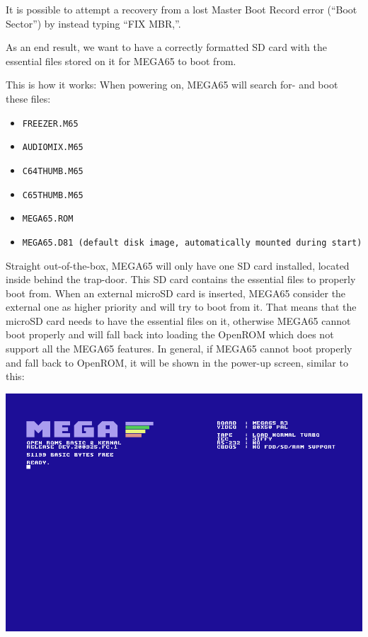 It is possible to attempt a recovery from a lost Master Boot Record error (``Boot Sector'') by instead typing ``FIX MBR,''.


As an end result, we want to have a correctly formatted SD card with the essential files stored on it for MEGA65 to boot from.

This is how it works: When powering on, MEGA65 will search for- and boot these files:
\begin{itemize}
\item {\tt FREEZER.M65}
\item {\tt AUDIOMIX.M65}
\item {\tt C64THUMB.M65}
\item {\tt C65THUMB.M65}
\item {\tt MEGA65.ROM}
\item {\tt MEGA65.D81 (default disk image, automatically mounted during start)}
\end{itemize}

Straight out-of-the-box, MEGA65 will only have one SD card installed, located inside behind the trap-door. This SD card contains the essential files to properly boot from.
When an external microSD card is inserted, MEGA65 consider the external one as higher priority and will try to boot from it.
That means that the microSD card needs to have the essential files on it, otherwise MEGA65 cannot boot properly and will fall back into loading the OpenROM which does not support all the MEGA65 features.
In general, if MEGA65 cannot boot properly and fall back to OpenROM, it will be shown in the power-up screen, similar to this:

\includegraphics[width=\linewidth]{images/mega65_OpenROM_boot_noSD.png}


